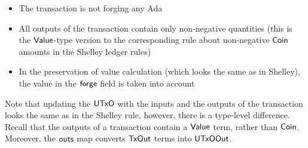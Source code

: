 \begin{itemize}
  \item The transaction is not forging any Ada

  \item All outputs of the transaction contain only non-negative quantities
  (this is the $\mathsf{Value}$-type version to the corresponding rule about non-negative
  $\mathsf{Coin}$ amounts in the Shelley ledger rules)

  \item In the preservation of value calculation (which looks the same as in
  Shelley), the value in the $\mathsf{forge}$ field is taken into account
\end{itemize}

Note that updating the $\mathsf{UTxO}$ with the inputs and the outputs of the transaction
looks the same as in the Shelley rule, however, there is a type-level difference.
Recall that the outputs of a transaction contain a $\mathsf{Value}$ term, rather than
$\mathsf{Coin}$. Moreover, the $\mathsf{outs}$ map converts $\mathsf{TxOut}$ terms into $\mathsf{UTxOOut}$.


